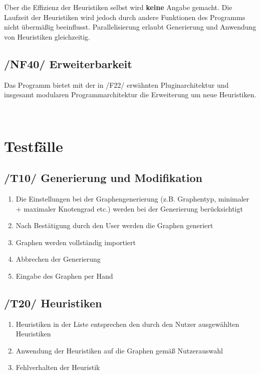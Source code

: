 \documentclass{article}
\begin{document}
	Über die Effizienz der Heuristiken selbst wird \textbf{keine} Angabe gemacht. Die Laufzeit der Heuristiken wird jedoch durch andere Funktionen des Programms nicht übermäßig beeinflusst. Parallelisierung erlaubt Generierung und Anwendung von Heuristiken gleichzeitig.
	
	\subsection*{/NF40/ Erweiterbarkeit} \label{nf40} 
	Das Programm bietet mit der in /F22/ erwähnten Pluginarchitektur und insgesamt modularen Programmarchitektur die Erweiterung um neue Heuristiken.
	
	
	~\newpage
	\section{Testfälle}
	\subsection*{/T10/ Generierung und Modifikation} \label{t10} 
	\begin{enumerate}[--]
		\item{Die Einstellungen bei der Graphengenerierung (z.B. Graphentyp, minimaler + maximaler Knotengrad etc.) werden bei der Generierung berücksichtigt}
		\item{Nach Bestätigung durch den User werden die Graphen generiert}
		\item{Graphen werden vollständig importiert}
		\item{Abbrechen der Generierung}
		\item{Eingabe des Graphen per Hand}
	\end{enumerate}
	
	\subsection*{/T20/ Heuristiken} \label{t20} 
	\begin{enumerate}[--]
		\item{Heuristiken in der Liste entsprechen den durch den Nutzer ausgewählten Heuristiken}
		\item{Anwendung der Heuristiken auf die Graphen gemäß Nutzerauswahl}
		\item{Fehlverhalten der Heuristik}
	\end{enumerate}
	
\end{document}
